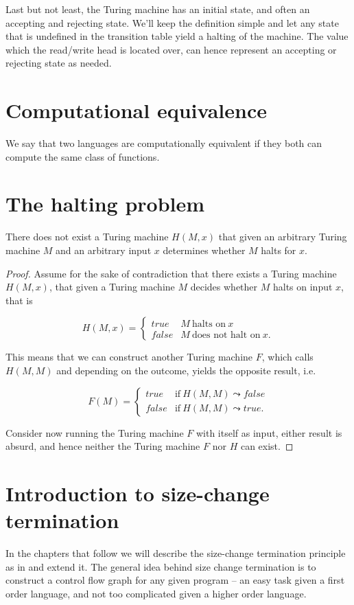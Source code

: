 Last but not least, the Turing machine has an initial state, and often an
accepting and rejecting state. We'll keep the definition simple and let any
state that is undefined in the transition table yield a halting of the machine.
The value which the read/write head is located over, can hence represent an
accepting or rejecting state as needed.

\section{Computational equivalence}

\begin{definition} We say that two languages are computationally equivalent if
they both can compute the same class of functions.\end{definition}

\section{The halting problem}

\begin{theorem} There does not exist a Turing machine $H(M,x)$ that given an
arbitrary Turing machine $M$ and an arbitrary input $x$ determines whether $M$
halts for $x$.\end{theorem}

\begin{proof}

Assume for the sake of contradiction that there exists a Turing machine
$H(M,x)$, that given a Turing machine $M$ decides whether $M$ halts on input
$x$, that is

$$H(M,x)=\left\{
\begin{array}{ll}
true&M\ \text{halts on}\ x\\
false&M\ \text{does not halt on}\ x.
\end{array}
\right.$$

This means that we can construct another Turing machine $F$, which calls
$H(M,M)$ and depending on the outcome, yields the opposite result, i.e. 

$$F(M)=\left\{
\begin{array}{ll}
true&\text{if}\ H(M,M)\leadsto false\\
false&\text{if}\ H(M,M)\leadsto true.
\end{array}
\right.$$

Consider now running the Turing machine $F$ with itself as input, either result
is absurd, and hence neither the Turing machine $F$ nor $H$ can
exist.\end{proof}

\section{Introduction to size-change termination}

In the chapters that follow we will describe the size-change termination
principle as in \cite{size-change} and extend it. The general idea behind size
change termination is to construct a control flow graph for any given program
-- an easy task given a first order language, and not too complicated given a
higher order language\cite{size-change-higher-order}.


